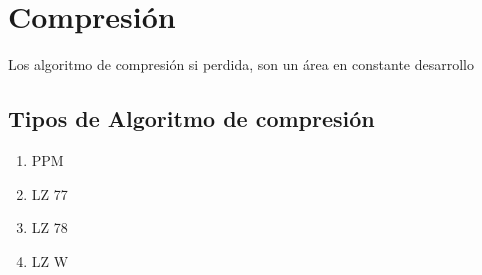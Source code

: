 \chapter[Tema]{Compresión}
\label{ch:tema}

Los algoritmo de compresión si perdida, son un área en constante desarrollo




\section{Tipos de Algoritmo de compresión}
 
	\begin{enumerate}
		\item PPM
		\item LZ 77
		\item LZ 78
		\item LZ W
		
	 	
	\end{enumerate}
	
 
 
 
 

\nocite{*}
